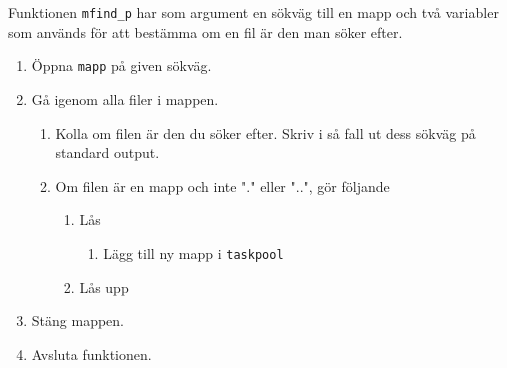 Funktionen \texttt{mfind\_p} har som argument en sökväg till en mapp och två variabler som används för att
bestämma om en fil är den man söker efter.
\begin{enumerate}
\item	Öppna \texttt{mapp} på given sökväg.
\item 	Gå igenom alla filer i mappen.
	\begin{enumerate}
	\item	Kolla om filen är den du söker efter. Skriv i så fall ut dess sökväg på standard output.
	\item 	Om filen är en mapp och inte "." eller "..", gör följande
		\begin{enumerate}
		\item	Lås \accessTaskPoolMutex
			\begin{enumerate}
			\item	Lägg till ny mapp i \texttt{taskpool}
			\end{enumerate}
		\item	Lås upp \accessTaskPoolMutex	
		\end{enumerate}
	\end{enumerate}
\item	Stäng mappen.
\item 	Avsluta funktionen.
\end{enumerate}
